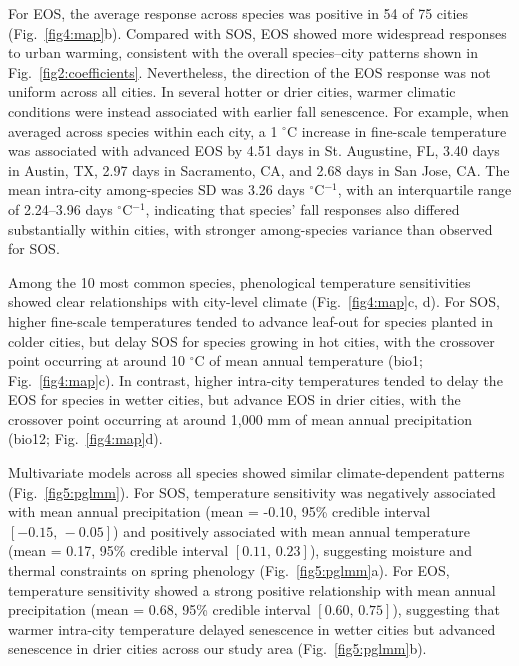 For EOS, the average response across species was positive in 54 of 75 cities (Fig.~\ref{fig4:map}b). Compared with SOS, EOS showed more widespread responses to urban warming, consistent with the overall species--city patterns shown in Fig.~\ref{fig2:coefficients}. Nevertheless, the direction of the EOS response was not uniform across all cities. In several hotter or drier cities, warmer climatic conditions were instead associated with earlier fall senescence. For example, when averaged across species within each city, a 1 $^\circ$C increase in fine-scale temperature was associated with advanced EOS by 4.51 days in St. Augustine, FL, 3.40 days in Austin, TX, 2.97 days in Sacramento, CA, and 2.68 days in San Jose, CA. The mean intra-city among-species SD was 3.26 days $^\circ$C$^{-1}$, with an interquartile range of 2.24--3.96 days $^\circ$C$^{-1}$, indicating that species' fall responses also differed substantially within cities, with stronger among-species variance than observed for SOS.

Among the 10 most common species, phenological temperature sensitivities showed clear relationships with city-level climate (Fig.~\ref{fig4:map}c, d). For SOS, higher fine-scale temperatures tended to advance leaf-out for species planted in colder cities, but delay SOS for species growing in hot cities, with the crossover point occurring at around 10 $^\circ$C of mean annual temperature (bio1; Fig.~\ref{fig4:map}c). In contrast, higher intra-city temperatures tended to delay the EOS for species in wetter cities, but advance EOS in drier cities, with the crossover point occurring at around 1,000 mm of mean annual precipitation (bio12; Fig.~\ref{fig4:map}d). 

Multivariate models across all species showed similar climate-dependent patterns (Fig.~\ref{fig5:pglmm}). For SOS, temperature sensitivity was negatively associated with mean annual precipitation (mean = -0.10, 95\% credible interval $[-0.15,\,-0.05]$) and positively associated with mean annual temperature (mean = 0.17, 95\% credible interval $[0.11,\,0.23]$), suggesting moisture and thermal constraints on spring phenology (Fig.~\ref{fig5:pglmm}a). For EOS, temperature sensitivity showed a strong positive relationship with mean annual precipitation (mean = 0.68, 95\% credible interval $[0.60,\,0.75]$), suggesting that warmer intra-city temperature delayed senescence in wetter cities but advanced senescence in drier cities across our study area (Fig.~\ref{fig5:pglmm}b).



